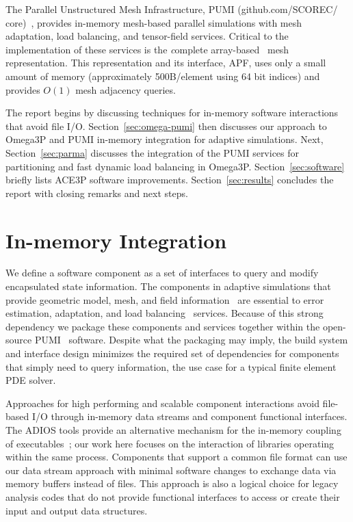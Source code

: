 \documentclass[a4paper]{article}
\begin{document}
The Parallel Unstructured Mesh Infrastructure, PUMI
{\small (github.com/SCOREC/\\core)}~\cite{ibanez2015pumi},
provides in-memory mesh-based parallel simulations with mesh adaptation, load
balancing, and tensor-field services.
Critical to the implementation of these services is the {\textit complete}
array-based~\cite{ibanezArray16} mesh representation.
This representation and its interface, APF, uses only a small amount of memory
(approximately 500B/element using 64 bit indices) and provides $O(1)$ mesh
adjacency queries.

The report begins by discussing techniques for in-memory software interactions
that avoid file I/O.
Section~\ref{sec:omega-pumi} then discusses our approach to Omega3P and PUMI
in-memory integration for adaptive simulations.
Next, Section~\ref{sec:parma} discusses the integration of the PUMI services
for partitioning and fast dynamic load balancing in Omega3P.
Section~\ref{sec:software} briefly lists ACE3P software improvements.
Section~\ref{sec:results} concludes the report with closing remarks and next
steps.

\section{In-memory Integration}\label{sec:inmem}

We define a software component as a set of interfaces to query and modify
encapsulated state information.
The components in adaptive simulations that provide geometric model, mesh, and
field information~\cite{BeaWal,ibanez2015pumi,Ollivier10} are essential to error
estimation, adaptation, and load balancing~\cite{SmithParma2015} services.
Because of this strong dependency we package these components and services
together within the open-source PUMI~\cite{ibanez2015pumi} software.
Despite what the packaging may imply, the build system and interface design
minimizes the required set of dependencies for components that simply need to
query information, the use case for a typical finite element PDE solver.

Approaches for high performing and scalable component interactions avoid
file-based I/O through in-memory data streams and component functional
interfaces.
The ADIOS tools provide an alternative mechanism for the in-memory coupling of
executables~\cite{bennett2012combining,zhang2012enabling}; our work here focuses
on the interaction of libraries operating within the same process.
Components that support a common file format can use our data stream approach
with minimal software changes to exchange data via memory buffers instead of files.
This approach is also a logical choice for legacy analysis codes that do not
provide functional interfaces to access or create their input and output data
structures.
\end{document}
